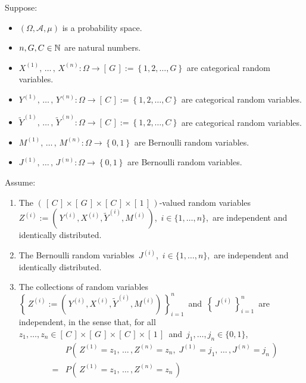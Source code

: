 \begin{proposition}
\mbox{}\vskip 0.1cm\noindent
Suppose:
\begin{itemize}
\item
	$\left(\Omega,\mathcal{A},\mu\right)$ is a probability space.
\item
	$n, G, C \in \mathbb{N}$ are natural numbers.
\item
	$X^{(1)}, \,\ldots\,,\, X^{(n)} : \Omega \longrightarrow \left[\,G\,\right] := \left\{1,2,\ldots,G\right\}$
	are categorical random variables.
\item
	$Y^{(1)}, \,\ldots\,,\, Y^{(n)} : \Omega \longrightarrow \left[\,C\,\right] := \left\{1,2,\ldots,C\right\}$
	are categorical random variables.
\item
	$\widetilde{Y}^{(1)}, \,\ldots\,,\, \widetilde{Y}^{(n)} : \Omega \longrightarrow \left[\,C\,\right] := \left\{1,2,\ldots,C\right\}$
	are categorical random variables.
\item
	$M^{(1)}, \,\ldots\,,\, M^{(n)} : \Omega \longrightarrow \left\{0,1\right\}$
	are Bernoulli random variables.
\item
	$J^{(1)}, \,\ldots\,,\, J^{(n)} : \Omega \longrightarrow \left\{0,1\right\}$
	are Bernoulli random variables.
\end{itemize}
Assume:
\begin{enumerate}
\item
	The $\left(\,\left[\,C\,\right] \times \left[\,G\,\right] \times \left[\,C\,\right] \times \left[\,1\,\right]\,\right)$-valued
	random variables
	\,$Z^{(i)} := \left(\,Y^{(i)},X^{(i)},\widetilde{Y}^{(i)},M^{(i)}\,\right)$,
	\,$i \in \{1, \ldots, n\}$,
	\,are independent and identically distributed.
\item
	The Bernoulli random variables \,$J^{(i)}$, \,$i \in \{1, \ldots, n\}$, \,are independent and identically distributed.
\item\label{Jindependence}
	The collections of random variables
	\,$\left\{\,Z^{(i)} := \left(\,Y^{(i)},X^{(i)},\widetilde{Y}^{(i)},M^{(i)}\right)\,\right\}_{i=1}^{n}$\,
	and
	\,$\left\{\,J^{(i)}\,\right\}_{i=1}^{n}$\,
	are independent, in the sense that, for all
	\,$z_{1}, \ldots, z_{n} \in \left[\,C\,\right] \times \left[\,G\,\right] \times \left[\,C\,\right] \times \left[\,1\,\right]$\,
	and
	\,$j_{1}, \ldots, j_{n} \in \{0,1\}$,\,
	\begin{eqnarray*}
	&&
		P\!\left(\,Z^{(1)}=z_{1},\,\ldots\,,Z^{(n)}=z_{n},\;J^{(1)}=j_{1},\,\ldots\,,J^{(n)}=j_{n}\,\right)
	\\
	& = &
		P\!\left(\,Z^{(1)}=z_{1},\,\ldots\,,Z^{(n)}=z_{n}\,\right)

\end{eqnarray*}
\end{enumerate}
\end{proposition}
